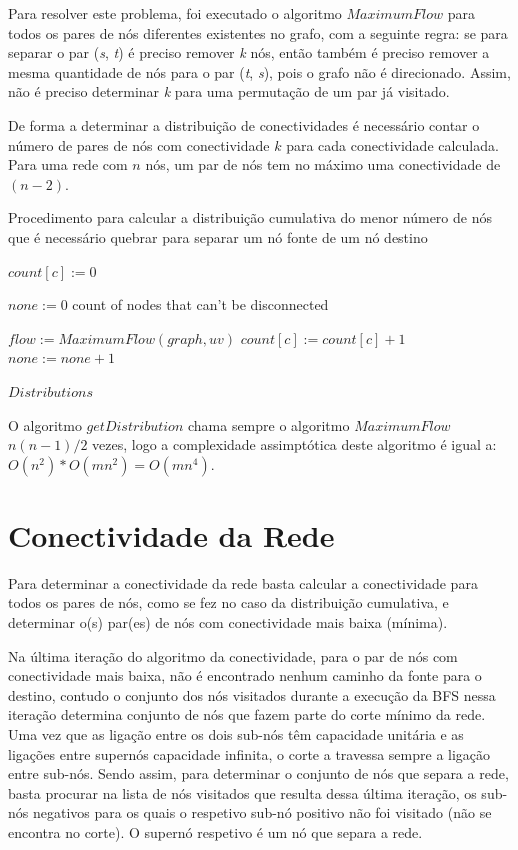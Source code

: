 \documentclass[12pt,a4paper]{article}
\begin{document}
Para resolver este problema, foi executado o algoritmo $MaximumFlow$ para todos os pares de nós diferentes existentes no grafo, com a seguinte regra: se para separar o par (\textit{s}, \textit{t}) é preciso remover \textit{k} nós, então também é preciso remover a mesma quantidade de nós para o par (\textit{t}, \textit{s}), pois o grafo não é direcionado. Assim, não é preciso determinar \textit{k} para uma permutação de um par já visitado.

De forma a determinar a distribuição de conectividades é necessário contar o número de pares de nós com conectividade $k$ para cada conectividade calculada. Para uma rede com $n$ nós, um par de nós tem no máximo uma conectividade de $(n - 2)$. 

\begin{algorithm}
\caption{Procedimento para calcular a distribuição cumulativa do menor número de nós que é necessário quebrar para separar um nó fonte de um nó destino}\label{alg:distribution}
\begin{algorithmic}[1]
    		\State $count[c] := 0$
    \EndFor
    
    \State $none := 0$ \Comment count of nodes that can't be disconnected
		
    		\State $flow := MaximumFlow(graph, uv)$
			\State $count[c] := count[c] + 1$
		\Else
			\State $none := none + 1$
		\EndIf
    \EndFor
    	
  	\Return $Distributions$
\EndProcedure
\end{algorithmic}
\end{algorithm}

O algoritmo $getDistribution$ chama sempre o algoritmo $MaximumFlow$ $n(n-1)/2$ vezes, logo a complexidade assimptótica deste algoritmo é igual a: $O(n^2) * O(m n^2) = O(m n^4)$.

\section{Conectividade da Rede}

Para determinar a conectividade da rede basta calcular a conectividade para todos os pares de nós, como se fez no caso da distribuição cumulativa, e determinar o(s) par(es) de nós com conectividade mais baixa (mínima).

Na última iteração do algoritmo da conectividade, para o par de nós com conectividade mais baixa, não é encontrado nenhum caminho da fonte para o destino, contudo o conjunto dos nós visitados durante a execução da BFS nessa iteração determina conjunto de nós que fazem parte do corte mínimo da rede. Uma vez que as ligação entre os dois sub-nós têm capacidade unitária e as ligações entre supernós capacidade infinita, o corte a travessa sempre a ligação entre sub-nós. Sendo assim, para determinar o conjunto de nós que separa a rede, basta procurar na lista de nós visitados que resulta dessa última iteração, os sub-nós negativos para os quais o respetivo sub-nó positivo não foi visitado (não se encontra no corte). O supernó respetivo é um nó que separa a rede.
\end{document}
